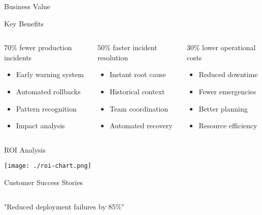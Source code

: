 \documentclass[presentation,aspectratio=169]{beamer}
\begin{document}
\begin{frame}[label={sec:orgd8892de}]{Business Value}
\begin{block}{Key Benefits}
\begin{columns}
\begin{column}{0.33\columnwidth}
\alert{70\% fewer} production incidents

\begin{itemize}
\item Early warning system
\item Automated rollbacks
\item Pattern recognition
\item Impact analysis
\end{itemize}
\end{column}
\begin{column}{0.33\columnwidth}
\alert{50\% faster} incident resolution

\begin{itemize}
\item Instant root cause
\item Historical context
\item Team coordination
\item Automated recovery
\end{itemize}
\end{column}
\begin{column}{0.34\columnwidth}
\alert{30\% lower} operational costs

\begin{itemize}
\item Reduced downtime
\item Fewer emergencies
\item Better planning
\item Resource efficiency
\end{itemize}
\end{column}
\end{columns}
\end{block}
\begin{block}{ROI Analysis}
\begin{center}
\begin{center}
\texttt{[image: ./roi-chart.png]}
\end{center}
\end{center}
\end{block}
\begin{block}{Customer Success Stories}
\begin{columns}
\begin{column}{0.5\columnwidth}
"Reduced deployment failures by 85\%"


\end{column}
\end{columns}
\end{block}
\end{frame}
\end{document}
